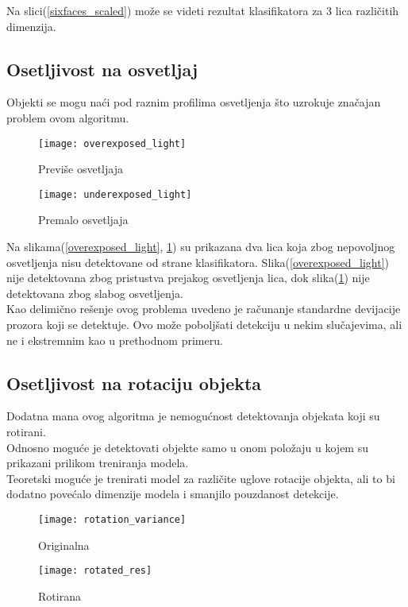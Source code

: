 Na slici(\ref{sixfaces_scaled}) može se videti rezultat klasifikatora za 3 lica
različitih dimenzija. \\

\newpage

\subsection{Osetljivost na osvetljaj}\label{lumi_inv_sec}

Objekti se mogu naći pod raznim profilima osvetljenja što uzrokuje značajan problem ovom algoritmu.


\begin{figure}[H]
  \centering
  \parbox{0.4\linewidth}{
    \texttt{[image: overexposed\_light]}
    \caption{Previše osvetljaja\cite{CALTECH_DATASET}}
    \label{overexposed_light}}
  \qquad
  \begin{minipage}{0.4\linewidth}
    \texttt{[image: underexposed\_light]}
    \caption{Premalo osvetljaja\cite{CALTECH_DATASET}}
    \label{underexposed_light}
  \end{minipage}
\end{figure}

Na slikama(\ref{overexposed_light}, \ref{underexposed_light}) su prikazana dva
lica koja zbog nepovoljnog osvetljenja nisu detektovane od strane
klasifikatora.
Slika(\ref{overexposed_light}) nije detektovana zbog pristustva prejakog osvetljenja
lica, dok slika(\ref{underexposed_light}) nije detektovana zbog slabog
osvetljenja.  \\

Kao delimično rešenje ovog problema uvedeno je računanje standardne devijacije
prozora koji se detektuje.
Ovo može poboljšati detekciju u nekim slučajevima, ali ne i ekstremnim kao u
prethodnom primeru.

\subsection{Osetljivost na rotaciju objekta}

Dodatna mana ovog algoritma je nemogućnost detektovanja objekata koji su
rotirani. \\
Odnosno moguće je detektovati objekte samo u onom položaju u kojem su prikazani
prilikom treniranja modela. \\
Teoretski moguće je trenirati model za različite uglove rotacije objekta, ali to
bi dodatno povećalo dimenzije modela i smanjilo pouzdanost detekcije. \\

\begin{figure}[H]
  \centering
  \parbox{0.4\linewidth}{
    \texttt{[image: rotation\_variance]}
    \caption{Originalna\cite{CALTECH_DATASET}}
    \label{rotation_variance}}
  \qquad
  \begin{minipage}{0.4\linewidth}
    \texttt{[image: rotated\_res]}
    \caption{Rotirana\cite{CALTECH_DATASET}}
    \label{rotated_res}
  \end{minipage}
\end{figure}